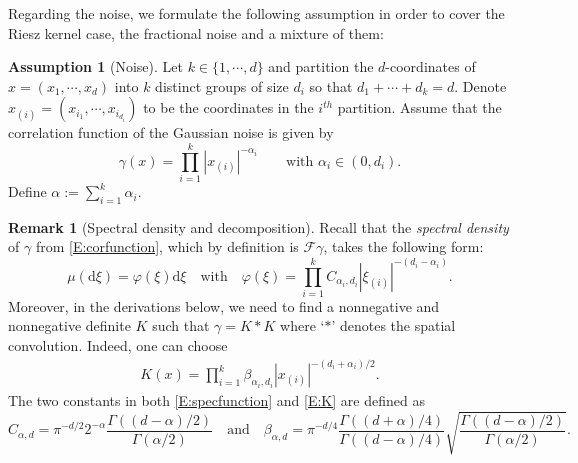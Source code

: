 \documentclass[a4paper,11pt]{article}
\numberwithin{equation}{section}
\numberwithin{equation}{section}
\theoremstyle{plain}
\theoremstyle{definition}
\newtheorem{assumption}[theorem]{Assumption}
\newtheorem{remark}[theorem]{Remark}
\newcommand{\ud}{\ensuremath{\mathrm{d} }}
\begin{document}
Regarding the noise, we formulate the following assumption in order to cover the Riesz kernel case,
the fractional noise and a mixture of them:
\begin{assumption}[Noise] \label{A:Noise}
  Let $k \in \{1, \cdots , d\}$ and partition the $d$-coordinates of $x=(x_1, \cdots, x_d)$ into $k$
  distinct groups of size $d_i$ so that $d_1 + \cdots + d_k = d$. Denote $x_{(i)} = (x_{i_1} ,
  \cdots , x_{i_{d_i}})$ to be the coordinates in the $i^{th}$ partition. Assume that the
  correlation function of the Gaussian noise is given by
  \begin{equation}
    \label{E:corfunction}
    \gamma(x) = \prod_{i=1}^k \left|x_{(i)}\right|^{-\alpha_i} \qquad \text{with $\alpha_i \in (0, d_i)$.}
  \end{equation}
  Define $\alpha := \sum_{i=1}^k \alpha_i$.
\end{assumption}

\begin{remark}[Spectral density and decomposition] \label{R:Noise}
  Recall that the {\it spectral density} of $\gamma$ from \eqref{E:corfunction}, which by definition is
  $\mathcal{F}\gamma$, takes the following form:
  \begin{equation}
  \label{E:specfunction}
  \mu (\ud \xi) = \varphi(\xi) \ud \xi \quad \text{with} \quad
  \varphi(\xi) = \prod_{i=1}^k C_{\alpha_i,d_i} |\xi_{(i)}|^{-(d_i-\alpha_i)}.
  \end{equation}
  Moreover, in the derivations below, we need to find a nonnegative and nonnegative definite $K$
  such that $\gamma = K*K$ where `$*$' denotes the spatial convolution. Indeed, one can choose
  \begin{align}
  \label{E:K}
  K(x) =\prod_{i=1}^k \beta_{\alpha_i,d_i} \left|x_{(i)}\right|^{-(d_i+\alpha_i)/2}.
  \end{align}
  The two constants in both \eqref{E:specfunction} and \eqref{E:K} are defined as
  \begin{equation}
    \label{E:noiseconstant}
    C_{\alpha,d}     = \pi^{-d/2}2^{-\alpha} \frac{\Gamma((d-\alpha)/2)}{\Gamma(\alpha/2)} \quad \text{and}\quad
    \beta_{\alpha,d} = \pi^{-d/4}\frac{\Gamma((d+\alpha)/4)}{\Gamma((d-\alpha)/4)}\sqrt{ \frac{\Gamma((d-\alpha)/2)}{\Gamma(\alpha/2)}}.
  \end{equation}
\end{remark}
\end{document}
